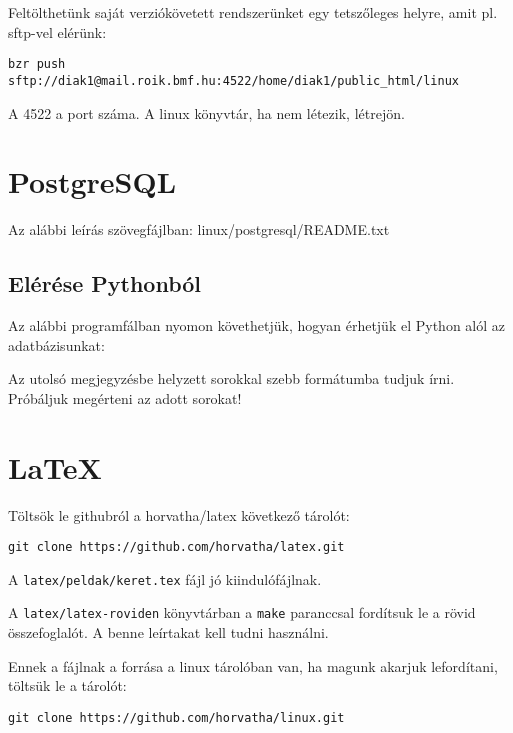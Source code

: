 \documentclass[a4paper]{article}
\begin{document}
Feltölthetünk saját verziókövetett rendszerünket egy tetszőleges helyre,
amit pl. sftp-vel elérünk:
\begin{Verbatim}
bzr push sftp://diak1@mail.roik.bmf.hu:4522/home/diak1/public_html/linux
\end{Verbatim}
A 4522 a port száma. A linux könyvtár, ha nem létezik,
létrejön.

\newpage
\section{PostgreSQL}

Az alábbi leírás szövegfájlban: linux/postgresql/README.txt



%

\subsection{Elérése Pythonból}

Az alábbi programfálban nyomon követhetjük, hogyan érhetjük el Python
alól az adatbázisunkat:


Az utolsó megjegyzésbe helyzett sorokkal szebb formátumba tudjuk írni.
Próbáljuk megérteni az adott sorokat!

\section{\LaTeX}

Töltsök le githubról a horvatha/latex következő tárolót:

\begin{Verbatim}
git clone https://github.com/horvatha/latex.git
\end{Verbatim}

A \verb!latex/peldak/keret.tex! fájl jó kiindulófájlnak.

A \verb!latex/latex-roviden! könyvtárban a \verb!make! paranccsal
fordítsuk le a rövid összefoglalót. A benne leírtakat kell tudni
használni.

Ennek a fájlnak a forrása a linux tárolóban van, ha magunk akarjuk
lefordítani, töltsük le a tárolót:

\begin{Verbatim}
git clone https://github.com/horvatha/linux.git
\end{Verbatim}
\end{document}
